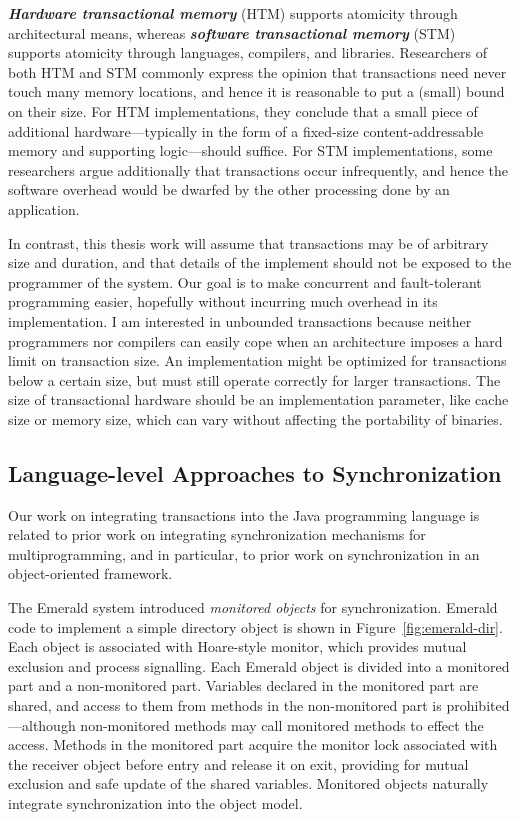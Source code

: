 \documentclass[12pt,oneside]{article}
\newcommand{\defn}[1]           {{\textit{\textbf{\boldmath #1}}}}
\begin{document}
\defn{Hardware transactional memory} (HTM) supports atomicity through
architectural means, whereas \defn{software transactional memory}
(STM) supports atomicity through languages, compilers, and libraries.
Researchers of both HTM and STM commonly express the opinion that
transactions need never touch many memory locations, and hence it is
reasonable to put a (small) bound on their size.  For HTM implementations,
they conclude that a small piece of additional hardware---typically in
the form of a fixed-size content-addressable memory and supporting
logic---should suffice.  For STM implementations, some researchers
argue additionally that transactions occur infrequently, and hence the
software overhead would be dwarfed by the other processing done by an
application.

In contrast, this thesis work will assume that transactions may be of
arbitrary size and duration, and that details of the implement should
not be exposed to the programmer of the system.  Our goal is to make
concurrent and fault-tolerant programming easier, hopefully without
incurring much 
overhead in its implementation.  I am interested in unbounded
transactions because neither programmers nor compilers can easily cope
when an architecture imposes a hard limit on transaction size.  An
implementation might be optimized for transactions below a certain
size, but must still operate correctly for larger transactions.  The
size of transactional hardware should be an implementation parameter,
like cache size or memory size, which can vary without affecting the
portability of binaries.

\subsection{Language-level Approaches to Synchronization}

Our work on integrating transactions into the Java programming
language is related to prior work on integrating synchronization
mechanisms for multiprogramming, and in particular, to prior work on
synchronization in an object-oriented framework.

The Emerald system \cite{BlackHuJuLe86,JulSt91} introduced
\emph{monitored objects} for synchronization.  Emerald code to
implement a simple directory object is shown in
Figure~\ref{fig:emerald-dir}.  Each object is associated with
Hoare-style monitor, which provides mutual exclusion and process
signalling.  Each Emerald object is divided into a monitored part and
a non-monitored part.  Variables declared in the monitored part are
shared, and access to them from methods in the non-monitored part is
prohibited---although non-monitored methods may call monitored methods
to effect the access.  Methods in the monitored part acquire the monitor lock
associated with the receiver object before entry and release it on
exit, providing for mutual exclusion and safe update of the shared
variables.  Monitored objects naturally integrate synchronization into
the object model.
\end{document}
